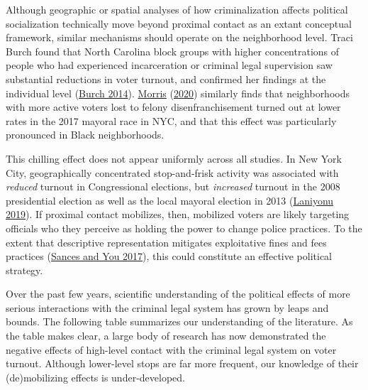 \documentclass[
  12pt,
]{article}
\begin{document}
Although geographic or spatial analyses of how criminalization affects political socialization technically move beyond proximal contact as an extant conceptual framework, similar mechanisms should operate on the neighborhood level. Traci Burch found that North Carolina block groups with higher concentrations of people who had experienced incarceration or criminal legal supervision saw substantial reductions in voter turnout, and confirmed her findings at the individual level (\protect\hyperlink{ref-Burch2014}{Burch 2014}). \protect\hyperlink{ref-Morris2020}{Morris} (\protect\hyperlink{ref-Morris2020}{2020}) similarly finds that neighborhoods with more active voters lost to felony disenfranchisement turned out at lower rates in the 2017 mayoral race in NYC, and that this effect was particularly pronounced in Black neighborhoods.

This chilling effect does not appear uniformly across all studies. In New York City, geographically concentrated stop-and-frisk activity was associated with \emph{reduced} turnout in Congressional elections, but \emph{increased} turnout in the 2008 presidential election as well as the local mayoral election in 2013 (\protect\hyperlink{ref-Laniyonu2019}{Laniyonu 2019}). If proximal contact mobilizes, then, mobilized voters are likely targeting officials who they perceive as holding the power to change police practices. To the extent that descriptive representation mitigates exploitative fines and fees practices (\protect\hyperlink{ref-Sances2017}{Sances and You 2017}), this could constitute an effective political strategy.

Over the past few years, scientific understanding of the political effects of more serious interactions with the criminal legal system has grown by leaps and bounds. The following table summarizes our understanding of the literature. As the table makes clear, a large body of research has now demonstrated the negative effects of high-level contact with the criminal legal system on voter turnout. Although lower-level stops are far more frequent, our knowledge of their (de)mobilizing effects is under-developed.

\begin{singlespace}

\end{singlespace}
\end{document}

